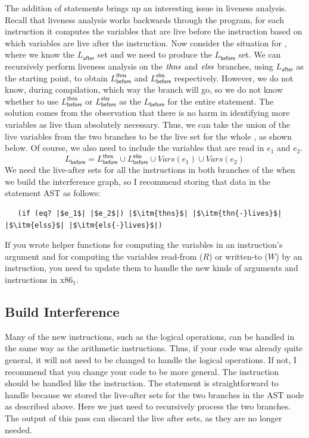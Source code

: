 \documentclass[11pt]{book}
\begin{document}
The addition of  statements brings up an interesting issue in
liveness analysis. Recall that liveness analysis works backwards
through the program, for each instruction it computes the variables
that are live before the instruction based on which variables are live
after the instruction. Now consider the situation for , where we know
the $L_{\mathsf{after}}$ set and we need to produce the
$L_{\mathsf{before}}$ set.  We can recursively perform liveness
analysis on the $\mathit{thns}$ and $\mathit{elss}$ branches, using
$L_{\mathsf{after}}$ as the starting point, to obtain
$L^{\mathsf{thns}}_{\mathsf{before}}$ and
$L^{\mathsf{elss}}_{\mathsf{before}}$ respectively. However, we do not
know, during compilation, which way the branch will go, so we do not
know whether to use $L^{\mathsf{thns}}_{\mathsf{before}}$ or
$L^{\mathsf{elss}}_{\mathsf{before}}$ as the $L_{\mathsf{before}}$ for
the entire  statement. The solution comes from the observation
that there is no harm in identifying more variables as live than
absolutely necessary. Thus, we can take the union of the live
variables from the two branches to be the live set for the whole
, as shown below. Of course, we also need to include the
variables that are read in $e_1$ and $e_2$.
\[
  L_{\mathsf{before}} = L^{\mathsf{thns}}_{\mathsf{before}} \cup
  L^{\mathsf{elss}}_{\mathsf{before}} \cup
  \mathit{Vars}(e_1) \cup \mathit{Vars}(e_2)
\]
We need the live-after sets for all the instructions in both branches
of the  when we build the interference graph, so I recommend
storing that data in the  statement AST as follows:
\begin{lstlisting}
   (if (eq? |$e_1$| |$e_2$|) |$\itm{thns}$| |$\itm{thn{-}lives}$| |$\itm{elss}$| |$\itm{els{-}lives}$|)
\end{lstlisting}

If you wrote helper functions for computing the variables in an
instruction's argument and for computing the variables read-from ($R$)
or written-to ($W$) by an instruction, you need to update them to
handle the new kinds of arguments and instructions in x86$_1$.

\subsection{Build Interference}
\label{sec:build-interference-r2}

Many of the new instructions, such as the logical operations, can be
handled in the same way as the arithmetic instructions. Thus, if your
code was already quite general, it will not need to be changed to
handle the logical operations. If not, I recommend that you change
your code to be more general. The  instruction should be
handled like the  instruction. The  statement is
straightforward to handle because we stored the live-after sets for
the two branches in the AST node as described above. Here we just need
to recursively process the two branches. The output of this pass can
discard the live after sets, as they are no longer needed.
\end{document}
